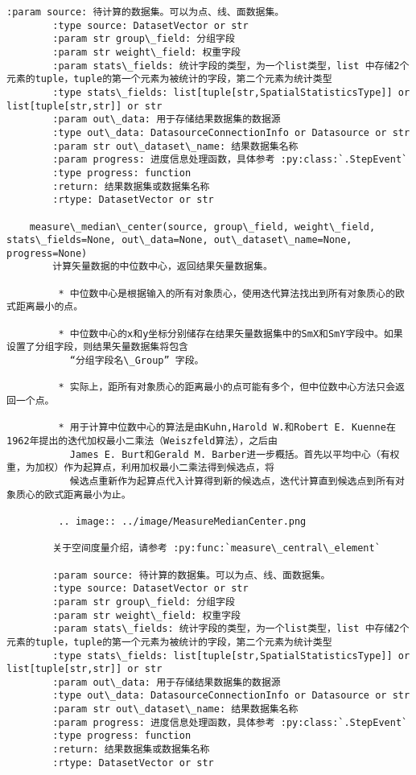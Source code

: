 \documentclass[11pt]{article}
\begin{document}
\begin{Verbatim}[commandchars=\\\{\}]
        :param source: 待计算的数据集。可以为点、线、面数据集。
        :type source: DatasetVector or str
        :param str group\_field: 分组字段
        :param str weight\_field: 权重字段
        :param stats\_fields: 统计字段的类型，为一个list类型，list 中存储2个元素的tuple，tuple的第一个元素为被统计的字段，第二个元素为统计类型
        :type stats\_fields: list[tuple[str,SpatialStatisticsType]] or list[tuple[str,str]] or str
        :param out\_data: 用于存储结果数据集的数据源
        :type out\_data: DatasourceConnectionInfo or Datasource or str
        :param str out\_dataset\_name: 结果数据集名称
        :param progress: 进度信息处理函数，具体参考 :py:class:`.StepEvent`
        :type progress: function
        :return: 结果数据集或数据集名称
        :rtype: DatasetVector or str
    
    measure\_median\_center(source, group\_field, weight\_field, stats\_fields=None, out\_data=None, out\_dataset\_name=None, progress=None)
        计算矢量数据的中位数中心，返回结果矢量数据集。
        
         * 中位数中心是根据输入的所有对象质心，使用迭代算法找出到所有对象质心的欧式距离最小的点。
        
         * 中位数中心的x和y坐标分别储存在结果矢量数据集中的SmX和SmY字段中。如果设置了分组字段，则结果矢量数据集将包含
           “分组字段名\_Group” 字段。
        
         * 实际上，距所有对象质心的距离最小的点可能有多个，但中位数中心方法只会返回一个点。
        
         * 用于计算中位数中心的算法是由Kuhn,Harold W.和Robert E. Kuenne在1962年提出的迭代加权最小二乘法（Weiszfeld算法），之后由
           James E. Burt和Gerald M. Barber进一步概括。首先以平均中心（有权重，为加权）作为起算点，利用加权最小二乘法得到候选点，将
           候选点重新作为起算点代入计算得到新的候选点，迭代计算直到候选点到所有对象质心的欧式距离最小为止。
        
         .. image:: ../image/MeasureMedianCenter.png
        
        关于空间度量介绍，请参考 :py:func:`measure\_central\_element`
        
        :param source: 待计算的数据集。可以为点、线、面数据集。
        :type source: DatasetVector or str
        :param str group\_field: 分组字段
        :param str weight\_field: 权重字段
        :param stats\_fields: 统计字段的类型，为一个list类型，list 中存储2个元素的tuple，tuple的第一个元素为被统计的字段，第二个元素为统计类型
        :type stats\_fields: list[tuple[str,SpatialStatisticsType]] or list[tuple[str,str]] or str
        :param out\_data: 用于存储结果数据集的数据源
        :type out\_data: DatasourceConnectionInfo or Datasource or str
        :param str out\_dataset\_name: 结果数据集名称
        :param progress: 进度信息处理函数，具体参考 :py:class:`.StepEvent`
        :type progress: function
        :return: 结果数据集或数据集名称
        :rtype: DatasetVector or str
    

\end{Verbatim}
\end{document}
